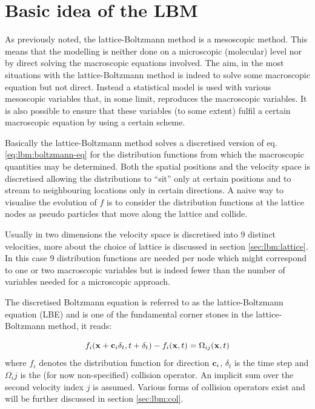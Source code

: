 \section{Basic idea of the LBM}
As previously noted, the lattice-Boltzmann method is a mesoscopic
method. This means that the modelling is neither done on a microscopic
(molecular) level nor by direct solving the macroscopic equations
involved. The aim, in the most situations with the lattice-Boltzmann
method is indeed to solve some macroscopic equation but not
direct. Instead a statistical model is used with various mesoscopic
variables that, in some limit, reproduces the macroscopic
variables. It is also possible to ensure that these variables (to some
extent) fulfil a certain macroscopic equation by using a certain
scheme.

Basically the lattice-Boltzmann method solves a discretised version of
eq. \eqref{eq:lbm:boltzmann-eq} for the distribution functions from
which the macroscopic quantities may be determined. Both the spatial
positions and the velocity space is discretised allowing the
distributions to ``sit'' only at certain positions and to stream to
neighbouring locations only in certain directions. A naive way to
visualise the evolution of $f$ is to consider the distribution
functions at the lattice nodes as pseudo particles that move along the
lattice and collide.

Usually in two dimensions the velocity space is discretised into 9
distinct velocities, more about the choice of lattice is discussed in
section \ref{sec:lbm:lattice}. In this case 9 distribution functions
are needed per node which might correspond to one or two macroscopic
variables but is indeed fewer than the number of variables needed for
a microscopic approach.

The discretised Boltzmann equation is referred to as the
lattice-Boltzmann equation (LBE) and is one of the fundamental corner
stones in the lattice-Boltzmann method, it reads:

\begin{equation}\label{eq:lbm:lbe}
f_i(\mathbf{x} + \mathbf{c}_i\delta_t, t + \delta_t) - f_i(\mathbf{x}, t) = \Omega_{ij}(\mathbf{x}, t)
\end{equation}
where $f_i$ denotes the distribution function for direction $\mathbf{c}_i$,
$\delta_t$ is the time step and $\Omega_ij$ is the (for now
non-specified) collision operator. An implicit sum over the second
velocity index $j$ is assumed. Various forms of collision operators
exist and will be further discussed in section \ref{sec:lbm:col}.

